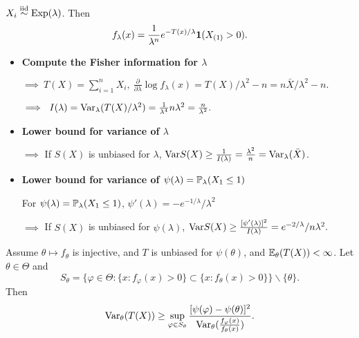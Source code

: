 \begin{exap}
	$X_i \stackrel{\text{iid}}{\sim} \mathrm{Exp}(\lambda)$. Then
	$$f_\lambda (x) = \frac{1}{\lambda^n} e^{-T(x)/\lambda} \boldsymbol{1}(X_{(1)} > 0).$$
	 
	\begin{itemize}
		\item \textbf{Compute the Fisher information for $\lambda$}
		
		$\implies\ T(X) = \sum_{i=1}^n X_i,\ \frac{\partial}{\partial \lambda} \log f_\lambda(x) = T(X)/\lambda^2 - n =n\bar{X}/\lambda^2 - n.$
		
		$\implies \ I(\lambda) = \mathrm{Var}_\lambda( T(X)/\lambda^2 ) = \frac{1}{\lambda^4} n \lambda^2 = \frac{n}{\lambda^2}.$
	
		\item \textbf{Lower bound for variance of $\lambda$}
			
		$\implies$ If $S(X)$ is unbiased for $\lambda$, $\mathrm{Var} S(X) \geq \frac{1}{I(\lambda)} = \frac{\lambda^2}{n} = \mathrm{Var}_\lambda (\bar{X})$.
		
		\item \textbf{Lower bound for variance of $\psi(\lambda) = \mathbb{P}_\lambda (X_1 \leq 1)$}
		
		For $\psi(\lambda) = \mathbb{P}_\lambda (X_1 \leq 1)$, $\psi'(\lambda) = -e^{-1/\lambda}/\lambda^2$
		
		$\implies$ If $S(X)$ is unbiased for $\psi(\lambda)$, $\mathrm{Var} S(X) \geq \frac{[\psi'(\lambda)]^2}{I(\lambda)} = e^{-2/\lambda}/  n\lambda^2 .$
	\end{itemize} 
\end{exap}
 

\begin{thm}
	Assume $\theta \mapsto f_\theta$ is injective, and $T$ is unbiased for $\psi(\theta)$, and $\mathbb{E}_\theta (T(X)) < \infty$. Let $\theta \in \Theta$ and 
	$$S_\theta = \Big \{ \varphi \in \Theta: \{ x: f_\varphi (x) > 0 \} \subset \{ x: f_\theta (x) > 0 \}  \Big \}  \backslash  \Big \{ \theta \Big \}.$$
	Then 
	$$ \mathrm{Var}_\theta (T(X)) \geq \sup_{\varphi \in S_\theta} \frac{  [\psi(\varphi) - \psi(\theta) ]^2 }{ \mathrm{Var}_\theta (\frac{ f_\varphi(x) }{  f_\theta (x)})   }.$$
\end{thm}

